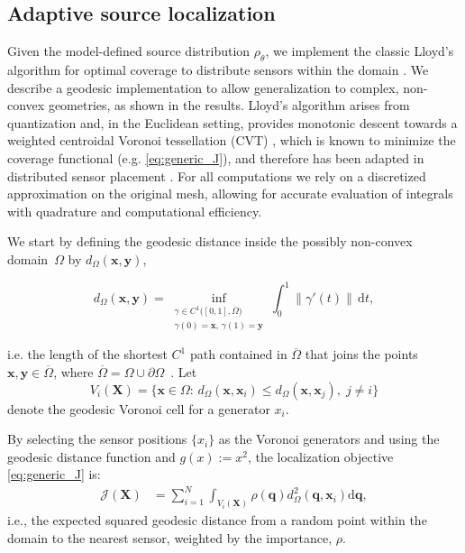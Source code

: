 \documentclass[onefignum,onetabnum]{siamart171218} %
\begin{document}
\subsection{Adaptive source localization} 
\label{sec:methodology_lloyds}
Given the model-defined source distribution $\rho_\theta$, we implement the classic Lloyd's algorithm for optimal coverage to distribute sensors within the domain \cite{cortes2004coverage}. We describe a geodesic implementation to allow generalization to complex, non-convex geometries, as shown in the results. Lloyd's algorithm arises from quantization and, in the Euclidean setting, provides monotonic descent towards a weighted centroidal Voronoi tessellation (CVT) \cite{du1999centroidal}, which is known to minimize the coverage functional (e.g. \eqref{eq:generic_J}), and therefore has been adapted in distributed sensor placement \cite{cortes2004coverage}. For all computations we rely on a discretized approximation on the original mesh, allowing for accurate evaluation of integrals with quadrature and computational efficiency.

We start by defining the geodesic distance inside the possibly non-convex domain~$\Omega$ by $d_\Omega(\mathbf{x},\mathbf{y})$,

\[
    \label{eq:geodesic}
    d_\Omega(\mathbf{x},\mathbf{y})
    =
    \inf_{\substack{\gamma\in C^{1}\!\bigl([0,1],\overline{\Omega}\bigr)\\
                    \gamma(0)=\mathbf{x},\,\gamma(1)=\mathbf{y}}}
    \int_{0}^{1}\!
    \bigl\|\gamma'(t)\bigr\|\,\mathrm{d}t,
\]

\noindent i.e. the length of the shortest $C^1$ path contained in
$\overline{\Omega}$ that joins the points
$\mathbf{x},\mathbf{y}\in\overline{\Omega}$, where $\overline{\Omega}=\Omega \cup \partial\Omega$~\cite{kimmel1998computing}. Let
\[
    V_i(\mathbf{X})
    =\bigl\{\mathbf{x}\in\Omega:\,d_\Omega(\mathbf{x},\mathbf{x}_i)
    \le d_\Omega(\mathbf{x},\mathbf{x}_j),\;j\neq i\bigr\}
\]
denote the geodesic Voronoi cell for a generator $x_i$.

By selecting the sensor positions
\(\{x_i\}\) as the Voronoi generators and using the geodesic distance function and \(g(x):=x^2\), the localization objective \eqref{eq:generic_J} is:
\begin{align}
    \label{eq:coverage_actual}
    \mathcal{J}(\mathbf{X})
    &=
    \sum_{i=1}^N
    \int_{V_i(\mathbf{X})}
    \rho(\mathbf{q})
    d_\Omega^2(\mathbf{q},\mathbf{x}_i)
    \mathrm{d}\mathbf{q}, %
\end{align}
i.e., the expected squared geodesic distance from a random point within the domain to the nearest sensor, weighted by the importance, \(\rho\). 
\end{document}
